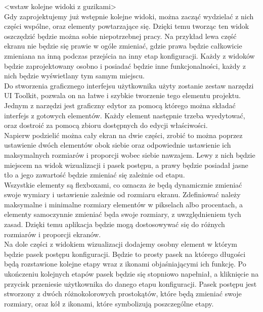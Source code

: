 \documentclass{article} %
\begin{document}
            <wstaw kolejne widoki z guzikami>
            \\
            
            Gdy zaprojektujemy już wstępnie kolejne widoki, można zacząć wydzielać z nich części wspólne, oraz elementy powtarzające się. Dzięki temu tworząc ten widok oszczędzić będzie można sobie niepotrzebnej pracy. Na przykład lewa część ekranu nie będzie się prawie w ogóle zmieniać, gdzie prawa będzie całkowicie zmieniana na inną podczas przejścia na inny etap konfiguracji. Każdy z widoków będzie zaprojektowany osobno i posiadać będzie inne funkcjonalności, każdy z nich będzie wyświetlany tym samym miejscu. 
            \\
            
            Do stworzenia graficznego interfejsu użytkownika użyty zostanie zestaw narzędzi UI Toolkit, pozwala on na łatwe i szybkie tworzenie tego elementu projektu. Jednym z narzędzi jest graficzny edytor za pomocą którego można składać interfejs z gotowych elementów. Każdy element następnie trzeba wyedytować, oraz dostroić za pomocą zbioru dostępnych do edycji właściwości.
            \\
            
            Napierw podzielić można cały ekran na dwie części, zrobić to można poprzez ustawienie dwóch elementów obok siebie oraz odpowiednie ustawienie ich maksymalnych rozmiarów i proporcji wobec siebie nawzajem. Lewy z nich będzie miejscem na widok wizualizacji i pasek postępu, a prawy będzie posiadał jasne tło a jego zawartość będzie zmieniać się zależnie od etapu. 
            \\
            
            Wszystkie elementy są flexboxami, co oznacza że będą dynamicznie zmieniać swoje wymiary i ustawienie zależnie od rozmiaru ekranu. Zdefiniować należy maksymalne i minimalne rozmiary elementów w pikselach albo procentach, a elementy samoczynnie zmieniać będa swoje rozmiary, z uwzględnieniem tych zasad. Dzięki temu aplikacja będzie mogą dostosowywać się do różnych rozmiarów i proporcji ekranów.
            \\
            
            Na dole części z widokiem wizualizacji dodajemy osobny element w którym będzie pasek postępu konfiguracji. Będzie to prosty pasek na którego długości będą rozstawione kolejne etapy wraz z ikonami objaśniającymi ich funkcję. Po ukończeniu kolejnych etapów pasek będzie się stopniowo napełniał, a kliknięcie na przycisk przeniesie użytkownika do danego etapu konfiguracji. Pasek postępu jest stworzony z dwóch różnokolorowych prostokątów, które będą zmieniać swoje rozmiary, oraz kół z ikonami, które symbolizują poszczególne etapy.
            \\
            
\end{document}
